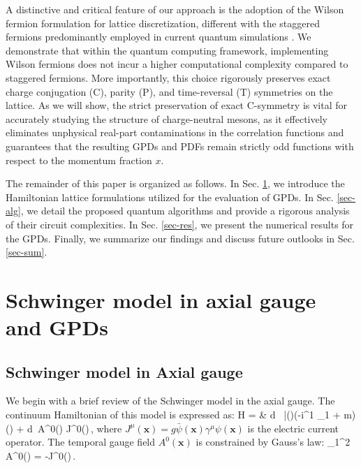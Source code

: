 \documentclass[aps,prd,twocolumn,superscriptaddress,notitlepage,nofootinbib,preprintnumbers]{revtex4-1}
\def\bea#1\eea{\begin{align}#1\end{align}}
\begin{document}
A distinctive and critical feature of our approach is the adoption of the Wilson fermion formulation \cite{Wilson:1974sk} for lattice discretization, different with the staggered fermions predominantly employed in current quantum simulations \cite{Zache:2018jbt}. We demonstrate that within the quantum computing framework, implementing Wilson fermions does not incur a higher computational complexity compared to staggered fermions. More importantly, this choice rigorously preserves exact charge conjugation (C), parity (P), and time-reversal (T) symmetries on the lattice. As we will show, the strict preservation of exact C-symmetry is vital for accurately studying the structure of charge-neutral mesons, as it effectively eliminates unphysical real-part contaminations in the correlation functions and guarantees that the resulting GPDs and PDFs remain strictly odd functions with respect to the momentum fraction $x$.

The remainder of this paper is organized as follows. In Sec. \ref{sec-swg}, we introduce the Hamiltonian lattice formulations utilized for the evaluation of GPDs. In Sec. \ref{sec-alg}, we detail the proposed quantum algorithms and provide a rigorous analysis of their circuit complexities. In Sec. \ref{sec-res}, we present the numerical results for the GPDs. Finally, we summarize our findings and discuss future outlooks in Sec. \ref{sec-sum}.


\section{Schwinger model in axial gauge and GPDs}
\label{sec-swg}
\subsection{Schwinger model in Axial gauge}
We begin with a brief review of the Schwinger model in the axial gauge. The continuum Hamiltonian of this model is expressed as:
\bea\label{eq:hax}
    H = & \int d \, \bar{\psi}()(-i\gamma^1 \partial_1 + m)\psi() +  \int d\, A^0() J^0()\,,
\eea
where $J^\mu(\mathbf{x}) = g\bar{\psi}(\mathbf{x})\gamma^\mu \psi(\mathbf{x})$ is the electric current operator. The temporal gauge field $A^0(\mathbf{x})$ is constrained by Gauss's law:
\bea\label{eq:axgau}
    \partial_1^2 A^0() = -J^0()\,.
\eea
\end{document}
